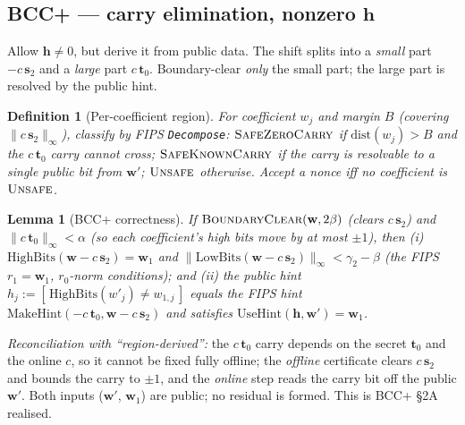 \documentclass[11pt]{article}
\newtheorem{lemma}{Lemma}
\newtheorem{definition}{Definition}
\theoremstyle{remark}\newtheorem{remark}{Remark}
\begin{document}
\subsection{BCC+ --- carry elimination, nonzero $\mathbf h$}
Allow $\mathbf h \neq 0$, but derive it from public data. The shift splits
into a \emph{small} part $-c\,\mathbf s_2$ and a \emph{large} part
$c\,\mathbf t_0$. Boundary-clear \emph{only} the small part; the large
part is resolved by the public hint.
\begin{definition}[Per-coefficient region]
For coefficient $w_j$ and margin $B$ (covering $\|c\,\mathbf
s_2\|_\infty$), classify by FIPS \texttt{Decompose}:
$\textsc{SafeZeroCarry}$ if $\mathrm{dist}(w_j) > B$ and the $c\,\mathbf
t_0$ carry cannot cross; $\textsc{SafeKnownCarry}$ if the carry is
resolvable to a single public bit from $\mathbf w'$; $\textsc{Unsafe}$
otherwise. Accept a nonce iff no coefficient is $\textsc{Unsafe}$.
\end{definition}
\begin{lemma}[BCC+ correctness]\label{lem:bccplus}
If $\textsc{BoundaryClear}(\mathbf w, 2\beta)$ (clears $c\,\mathbf s_2$)
and $\|c\,\mathbf t_0\|_\infty < \alpha$ (so each coefficient's high bits
move by at most $\pm 1$), then (i) $\mathrm{HighBits}(\mathbf w -
c\,\mathbf s_2) = \mathbf w_1$ and $\|\mathrm{LowBits}(\mathbf w -
c\,\mathbf s_2)\|_\infty < \gamma_2 - \beta$ (the FIPS $r_1{=}\mathbf
w_1$, $r_0$-norm conditions); and (ii) the public hint $h_j := [\,
\mathrm{HighBits}(w'_j) \neq w_{1,j}\,]$ equals the FIPS hint
$\mathrm{MakeHint}(-c\,\mathbf t_0, \mathbf w - c\,\mathbf s_2)$ and
satisfies $\mathrm{UseHint}(\mathbf h, \mathbf w') = \mathbf w_1$.
\end{lemma}
\emph{Reconciliation with ``region-derived'':} the $c\,\mathbf t_0$ carry
depends on the secret $\mathbf t_0$ and the online $c$, so it cannot be
fixed fully offline; the \emph{offline} certificate clears $c\,\mathbf
s_2$ and bounds the carry to $\pm 1$, and the \emph{online} step reads the
carry bit off the public $\mathbf w'$. Both inputs ($\mathbf w'$, $\mathbf
w_1$) are public; no residual is formed. This is BCC+ \S2A realised.
\end{document}
